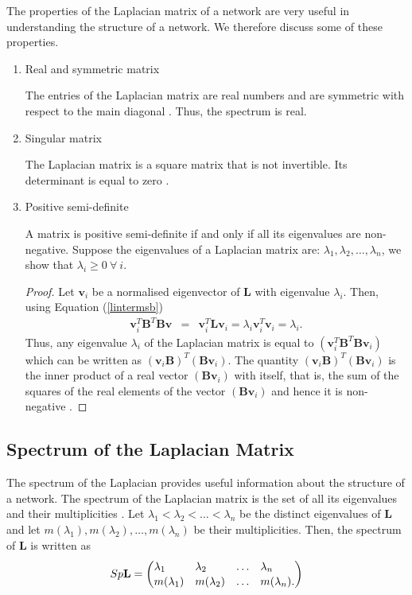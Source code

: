 \documentclass[10pt,a4paper]{article}
\begin{document}
The properties of the Laplacian matrix of a network are very useful in understanding the structure of a network. We therefore discuss some of these properties.
\begin{enumerate}	
\item{Real and symmetric matrix} 

The entries of the Laplacian matrix are real numbers and are symmetric with respect to the main diagonal \citep{das2004laplacian}. Thus, the spectrum is real.
\item{Singular matrix}

The Laplacian matrix is a square matrix that is not invertible. Its determinant is equal to zero \citep{das2004laplacian}.
\item{Positive semi-definite}

A matrix is positive semi-definite if and only if all its eigenvalues are non-negative. Suppose the eigenvalues of a Laplacian matrix are: $\lambda_1,\lambda_2,\ldots, \lambda_n$, we show that $\lambda_i \geq 0 ~\forall~i$.
\begin{proof}
	Let $\mathbf{v}_i$ be a normalised eigenvector of $\mathbf{L}$ with eigenvalue $\lambda_i$. Then, using Equation (\ref{lintermsb})
	\begin{eqnarray*}
		\mathbf{v}_i^T \mathbf{B}^T \mathbf{B} \mathbf{v} &=& \mathbf{v}_i^T \mathbf{L} \mathbf{v}_i = \lambda_i  \mathbf{v}_i^T \mathbf{v}_i  = \lambda_i.
	\end{eqnarray*}  
	Thus, any eigenvalue $\lambda_i$ of the Laplacian matrix is equal 
	to $(\mathbf{v}_i^T \mathbf{B}^T \mathbf{B} \mathbf{v}_i)$ which can be written as $(\mathbf{v}_i \mathbf{B})^T (\mathbf{B} \mathbf{v}_i)$. The quantity $(\mathbf{v}_i \mathbf{B})^T (\mathbf{B} \mathbf{v}_i)$  is the inner product of a real vector $(\mathbf{B} \mathbf{v}_i)$ with itself, that is, the sum of the squares of the real elements of the vector $(\mathbf{B} \mathbf{v}_i)$ and hence it is non-negative \citep{estrada2015first}.
\end{proof}
\end{enumerate}
\subsection{Spectrum of the Laplacian Matrix}
The spectrum of the Laplacian provides useful information about the structure of a network. The spectrum of the Laplacian matrix is the set of all its eigenvalues and their multiplicities \citep{estrada2011structure}. Let $\lambda_1 < \lambda_2 < \ldots < \lambda_n$ be the distinct eigenvalues of $\mathbf{L}$ and let $m(\lambda_1),m(\lambda_2), \ldots,m(\lambda_n)$ be their multiplicities. Then, the spectrum of $\mathbf{L}$ is written as
\begin{eqnarray}
Sp\mathbf{L} = 
\renewcommand*{\arraystretch}{1.1}
\begin{pmatrix*}[l]
\lambda_1 & \lambda_2 & \ldots & \lambda_n \\
m(\lambda_1) & m(\lambda_2) & \ldots & m(\lambda_n).
\end{pmatrix*}
\end{eqnarray}
\end{document}
